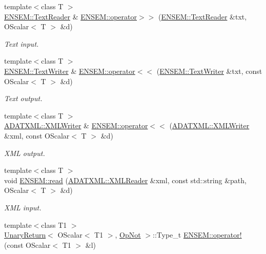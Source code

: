 \begin{DoxyCompactItemize}
{\footnotesize template$<$class T $>$ }\\\mbox{\hyperlink{classENSEM_1_1TextReader}{E\+N\+S\+E\+M\+::\+Text\+Reader}} \& \mbox{\hyperlink{group__obsscalar_ga0ec7538d973fc2e40220fd1ef622f982}{E\+N\+S\+E\+M\+::operator$>$$>$}} (\mbox{\hyperlink{classENSEM_1_1TextReader}{E\+N\+S\+E\+M\+::\+Text\+Reader}} \&txt, O\+Scalar$<$ T $>$ \&d)
\begin{DoxyCompactList}\small\item\em Text input. \end{DoxyCompactList}\item 
{\footnotesize template$<$class T $>$ }\\\mbox{\hyperlink{classENSEM_1_1TextWriter}{E\+N\+S\+E\+M\+::\+Text\+Writer}} \& \mbox{\hyperlink{group__obsscalar_gaa7ba73cd5fa56a8fc62b9f9297fbef31}{E\+N\+S\+E\+M\+::operator$<$$<$}} (\mbox{\hyperlink{classENSEM_1_1TextWriter}{E\+N\+S\+E\+M\+::\+Text\+Writer}} \&txt, const O\+Scalar$<$ T $>$ \&d)
\begin{DoxyCompactList}\small\item\em Text output. \end{DoxyCompactList}\item 
{\footnotesize template$<$class T $>$ }\\\mbox{\hyperlink{classADATXML_1_1XMLWriter}{A\+D\+A\+T\+X\+M\+L\+::\+X\+M\+L\+Writer}} \& \mbox{\hyperlink{group__obsscalar_ga2eb6bed5bd0b7f67a0a0641033b3a120}{E\+N\+S\+E\+M\+::operator$<$$<$}} (\mbox{\hyperlink{classADATXML_1_1XMLWriter}{A\+D\+A\+T\+X\+M\+L\+::\+X\+M\+L\+Writer}} \&xml, const O\+Scalar$<$ T $>$ \&d)
\begin{DoxyCompactList}\small\item\em X\+ML output. \end{DoxyCompactList}\item 
{\footnotesize template$<$class T $>$ }\\void \mbox{\hyperlink{group__obsscalar_ga8844f89649f50b51ab6ae9f43064458c}{E\+N\+S\+E\+M\+::read}} (\mbox{\hyperlink{classADATXML_1_1XMLReader}{A\+D\+A\+T\+X\+M\+L\+::\+X\+M\+L\+Reader}} \&xml, const std\+::string \&path, O\+Scalar$<$ T $>$ \&d)
\begin{DoxyCompactList}\small\item\em X\+ML input. \end{DoxyCompactList}\item 
{\footnotesize template$<$class T1 $>$ }\\\mbox{\hyperlink{structUnaryReturn}{Unary\+Return}}$<$ O\+Scalar$<$ T1 $>$, \mbox{\hyperlink{structOpNot}{Op\+Not}} $>$\+::Type\+\_\+t \mbox{\hyperlink{group__obsscalar_gaa78e8f77d7f0b9803c015de6cc93c228}{E\+N\+S\+E\+M\+::operator!}} (const O\+Scalar$<$ T1 $>$ \&l)

\end{DoxyCompactItemize}
